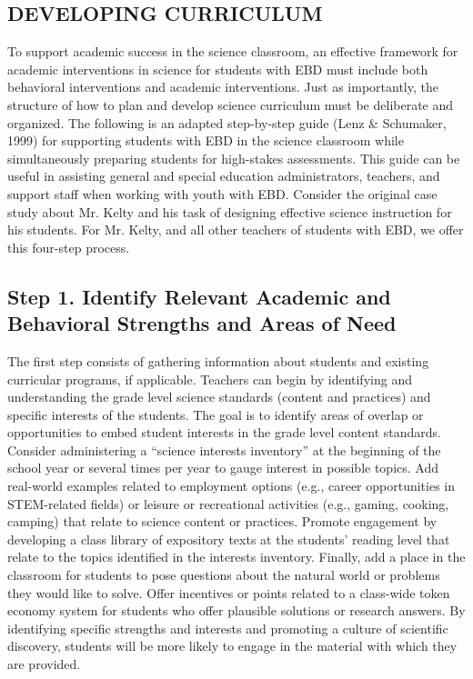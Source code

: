 \documentclass[11.5pt]{sig-alternate} %
\begin{document}
\begin{large}
\section*{DEVELOPING CURRICULUM}
	
To support academic success in the science classroom, an effective framework for academic interventions in science for students with EBD must include both behavioral interventions and academic interventions. Just as importantly, the structure of how to plan and develop science curriculum must be deliberate and organized. The following is an adapted step-by-step guide (Lenz \& Schumaker, 1999) for supporting students with EBD in the science classroom while simultaneously preparing students for high-stakes assessments. This guide can be useful in assisting general and special education administrators, teachers, and support staff when working with youth with EBD. Consider the original case study about Mr. Kelty and his task of designing effective science instruction for his students. For Mr. Kelty, and all other teachers of students with EBD, we offer this four-step process.

\subsection*{Step 1. Identify Relevant Academic and Behavioral Strengths and Areas of Need}

The first step consists of gathering information about students and existing curricular programs, if applicable. Teachers can begin by identifying and understanding the grade level science standards (content and practices) and specific interests of the students. The goal is to identify areas of overlap or opportunities to embed student interests in the grade level content standards. Consider administering a “science interests inventory” at the beginning of the school year or several times per year to gauge interest in possible topics. Add real-world examples related to employment options (e.g., career opportunities in STEM-related fields) or leisure or recreational activities (e.g., gaming, cooking, camping) that relate to science content or practices. Promote engagement by developing a class library of expository texts at the students’ reading level that relate to the topics identified in the interests inventory. Finally, add a place in the classroom for students to pose questions about the natural world or problems they would like to solve. Offer incentives or points related to a class-wide token economy system for students who offer plausible solutions or research answers. By identifying specific strengths and interests and promoting a culture of scientific discovery, students will be more likely to engage in the material with which they are provided.


\end{large}
\end{document}
